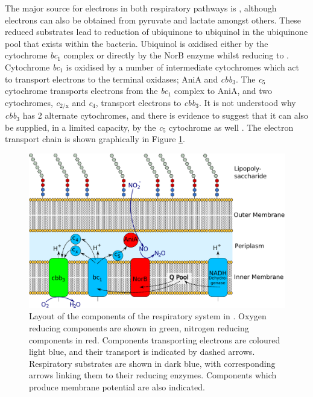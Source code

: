 The major source for electrons in both respiratory pathways is , although electrons can also be obtained from pyruvate and lactate amongst others. These reduced substrates lead to reduction of ubiquinone to ubiquinol in the ubiquinone pool that exists within the bacteria. Ubiquinol is oxidised either by the cytochrome \textit{bc$_{\textrm{1}}$} complex or directly by the NorB enzyme whilst reducing \cNO\space to \cNtwoO. Cytochrome \textit{bc$_{\textrm{1}}$} is oxidised by a number of intermediate cytochromes which act to transport electrons to the terminal oxidases; AniA and \textit{cbb$_{\textrm{3}}$}. The \textit{c$_{\textrm{5}}$} cytochrome transports electrons from the \textit{bc$_{\textrm{1}}$} complex to AniA, and two cytochromes, \textit{c$_{\textrm{2/x}}$} and \textit{c$_{\textrm{4}}$}, transport electrons to \textit{cbb$_{\textrm{3}}$}. It is not understood why \textit{cbb$_{\textrm{3}}$} has 2 alternate cytochromes, and there is evidence to suggest that it can also be supplied, in a limited capacity, by the \textit{c$_{\textrm{5}}$} cytochrome as well \cite{Deeudom2008}. The electron transport chain is shown graphically in Figure \ref{fig:etc}.

\begin{figure}
 \begin{center}
 \includegraphics[width=14cm]{./01-introduction/data/Respiratory_layout.pdf}
\end{center}
\caption{\footnotesize Layout of the components of the respiratory system in \Nsm. Oxygen reducing components are shown in green, nitrogen reducing components in red. Components transporting electrons are coloured light blue, and their transport is indicated by dashed arrows. Respiratory substrates are shown in dark blue, with corresponding arrows linking them to their reducing enzymes. Components which produce membrane potential are also indicated.
\label{fig:etc}}
\end{figure}

